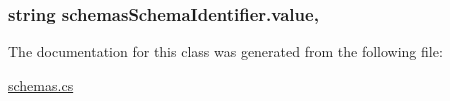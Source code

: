 \subsubsection[{\texorpdfstring{value}{value}}]{\setlength{\rightskip}{0pt plus 5cm}string schemas\+Schema\+Identifier.\+value\hspace{0.3cm}{\ttfamily [get]}, {\ttfamily [set]}}\hypertarget{classschemas_schema_identifier_a0dcd51bb1fb87d49765cf031b4425a46}{}\label{classschemas_schema_identifier_a0dcd51bb1fb87d49765cf031b4425a46}






The documentation for this class was generated from the following file\+:\begin{DoxyCompactItemize}
\item 
\hyperlink{schemas_8cs}{schemas.\+cs}\end{DoxyCompactItemize}
